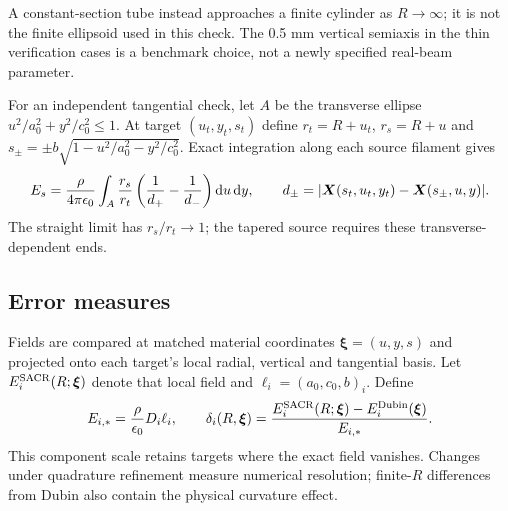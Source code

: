 A constant-section tube instead approaches a finite cylinder as $R\to\infty$;
it is not the finite ellipsoid used in this check. The 0.5 mm vertical semiaxis
in the thin verification cases is a benchmark choice, not a newly specified
real-beam parameter.

For an independent tangential check, let $A$ be the transverse ellipse
$u^2/a_0^2+y^2/c_0^2\le1$. At target $(u_t,y_t,s_t)$ define
$r_t=R+u_t$, $r_s=R+u$ and
$s_\pm=\pm b\sqrt{1-u^2/a_0^2-y^2/c_0^2}$. Exact integration along each
source filament gives
\begin{equation}
 E_s=\frac{\rho}{4\pi\epsilon_0}\int_A\frac{r_s}{r_t}
 \left(\frac{1}{d_+}-\frac{1}{d_-}\right)\mathrm d u\,\mathrm d y,
 \qquad d_\pm=|\bm X(s_t,u_t,y_t)-\bm X(s_\pm,u,y)|.
 \label{eq:sacr-endpoint}
\end{equation}
The straight limit has $r_s/r_t\to1$; the tapered source requires these
transverse-dependent ends.

\subsection{Error measures}
Fields are compared at matched material coordinates $\bm\xi=(u,y,s)$ and projected
onto each target's local radial, vertical and tangential basis. Let
$E_i^{\rm SACR}(R;\bm\xi)$ denote that local field and
$\ell_i=(a_0,c_0,b)_i$. Define
\begin{equation}
 E_{i,*}=\frac{\rho}{\epsilon_0}D_i\ell_i,\qquad
 \delta_i(R,\bm\xi)=\frac{E_i^{\rm SACR}(R;\bm\xi)-E_i^{\rm Dubin}(\bm\xi)}{E_{i,*}}.
 \label{eq:sacr-error}
\end{equation}
This component scale retains targets where the exact field vanishes. Changes
under quadrature refinement measure numerical resolution; finite-$R$
differences from Dubin also contain the physical curvature effect.


